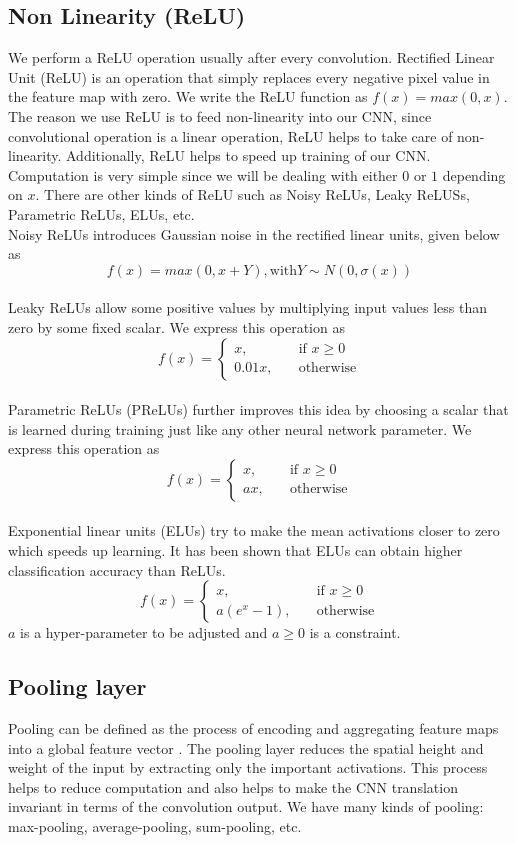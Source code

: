 \documentclass[master]{thesis-uestc}
\begin{document}
\subsection*{Non Linearity (ReLU)}
We perform a ReLU operation usually after every convolution. Rectified Linear Unit (ReLU) is an operation that simply replaces every negative pixel value in the feature map with zero. We write the ReLU function as $f(x) = max(0,x)$. The reason we use ReLU is to feed non-linearity into our CNN, since convolutional operation is a linear operation, ReLU helps to take care of non-linearity. Additionally, ReLU helps to speed up training of our CNN. Computation is very simple since we will be dealing with either $0$ or $1$ depending on $x$. There are other kinds of ReLU such as Noisy ReLUs\cite{Nair:2010:RLU:3104322.3104425}, Leaky ReLUSs\cite{Maas2013RectifierNI}, Parametric ReLUs\cite{7410480}, ELUs\cite{Clevert2015FastAA}, etc. \\
Noisy ReLUs introduces Gaussian noise in the rectified linear units, given below as
\[ f(x) = max(0, x + Y), \text{with} Y \sim N(0, \sigma(x))\] \\
Leaky ReLUs allow some positive values by multiplying input values less than zero by some fixed scalar. We express this operation as
\[ f(x) =
  \begin{cases}
    x, & \quad  \text{if } x \geq 0\\
    0.01x, & \quad \text{otherwise}
  \end{cases}
\] \\
Parametric ReLUs (PReLUs) further improves this idea by choosing a scalar that is learned during training just like any other neural network parameter. We express this operation as
\[ f(x) =
  \begin{cases}
    x, & \quad  \text{if } x \geq 0\\
    ax, & \quad \text{otherwise}
  \end{cases}
\] \\
Exponential linear units (ELUs) try to make the mean activations closer to zero which speeds up learning. It has been shown that ELUs can obtain higher classification accuracy than ReLUs.
\[ f(x) =
  \begin{cases}
    x, & \quad  \text{if } x \geq 0\\
    a(e^x - 1), & \quad \text{otherwise}
  \end{cases}
\]
$a$ is a hyper-parameter to be adjusted and $a \geq 0$ is a constraint.

\subsection*{Pooling layer}
Pooling can be defined as the process of encoding and aggregating feature maps into a global feature vector \cite{cui2017cvpr}. The pooling layer reduces the spatial height and weight of the input by extracting only the important activations. This process helps to reduce computation and also helps to make the CNN translation invariant in terms of the convolution output. We have many kinds of pooling: max-pooling, average-pooling, sum-pooling, etc.
\end{document}
